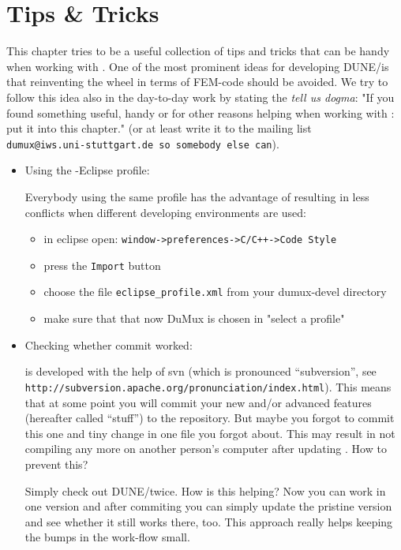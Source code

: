 \chapter{Tips \& Tricks}
This chapter tries to be a useful collection of tips and tricks that can be handy when working with 
\Dumux. One of the most prominent ideas for developing DUNE/\Dumux is that reinventing the wheel in terms of FEM-code should
be avoided.  We try to follow this idea also in the day-to-day work by stating the \emph{tell us dogma}: "If you found something useful, 
handy or for other reasons helping when working with \Dumux: put it into this chapter." (or at least write it to the mailing list \\ \verb+dumux@iws.uni-stuttgart.de so somebody else can+). 
\begin{itemize}
 \item Using the \Dumux-Eclipse profile:

Everybody using the same profile has the advantage of  resulting in less conflicts when different developing environments are used:
\begin{itemize}
 \item in eclipse open: \verb#window->preferences->C/C++->Code Style#
  \item press the \verb+Import+ button
  \item choose the file \verb+eclipse_profile.xml+ from your dumux-devel directory
  \item make sure that that now DuMux is chosen in "select a profile"
\end{itemize}

\item Checking whether commit worked:

\Dumux is developed with the help of svn (which is pronounced ``subversion'', see \\\verb+http://subversion.apache.org/pronunciation/index.html+). This means that at some point you will commit your new 
and/or advanced features (hereafter called ``stuff'') to the repository. But maybe you forgot to commit this one and tiny change in one file you forgot about. 
This may result in \Dumux not compiling any more on another person's computer after updating . How to prevent this?

Simply check out DUNE/\Dumux twice. How is this helping? Now you can work in one version and after commiting you can simply update the pristine version and see whether it still works there, too. 
This approach really helps keeping the bumps in the work-flow small.


\end{itemize}
